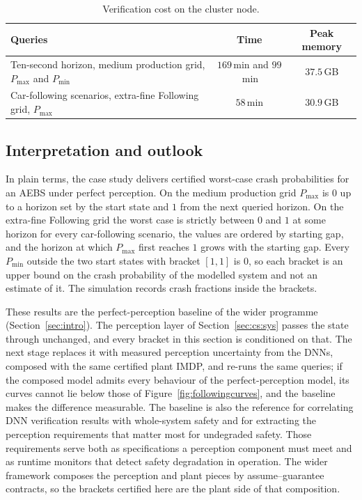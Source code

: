 \documentclass[11pt,a4paper]{article}
\theoremstyle{plain}
\theoremstyle{remark}
\begin{document}
	\begin{table}[H]
		\centering
		\small
		\begin{tabular}{lcc}
			\toprule
			Queries & Time & Peak memory \\
			\midrule
			Ten-second horizon, medium production grid, $P_{\max}$ and $P_{\min}$ & $169$\,min and $99$\,min & $37.5$\,GB \\
			Car-following scenarios, extra-fine Following grid, $P_{\max}$ & $58$\,min & $30.9$\,GB \\
			\bottomrule
		\end{tabular}
		\caption{Verification cost on the cluster node.}
		\label{tab:cost}
	\end{table}
	
	\subsection{Interpretation and outlook}
	\label{sec:cs:interp}
	
	In plain terms, the case study delivers certified worst-case crash probabilities for an AEBS under perfect perception. On the medium production grid $P_{\max}$ is $0$ up to a horizon set by the start state and $1$ from the next queried horizon. On the extra-fine Following grid the worst case is strictly between $0$ and $1$ at some horizon for every car-following scenario, the values are ordered by starting gap, and the horizon at which $P_{\max}$ first reaches $1$ grows with the starting gap. Every $P_{\min}$ outside the two start states with bracket $[1,1]$ is $0$, so each bracket is an upper bound on the crash probability of the modelled system and not an estimate of it. The simulation records crash fractions inside the brackets.
	
	These results are the perfect-perception baseline of the wider programme (Section~\ref{sec:intro}). The perception layer of Section~\ref{sec:cs:sys} passes the state through unchanged, and every bracket in this section is conditioned on that. The next stage replaces it with measured perception uncertainty from the DNNs, composed with the same certified plant IMDP, and re-runs the same queries; if the composed model admits every behaviour of the perfect-perception model, its curves cannot lie below those of Figure~\ref{fig:followingcurves}, and the baseline makes the difference measurable. The baseline is also the reference for correlating DNN verification results with whole-system safety and for extracting the perception requirements that matter most for undegraded safety. Those requirements serve both as specifications a perception component must meet and as runtime monitors that detect safety degradation in operation. The wider framework composes the perception and plant pieces by assume--guarantee contracts, so the brackets certified here are the plant side of that composition.
	
\end{document}
